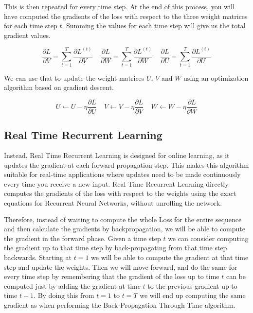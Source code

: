 \noindent This is then repeated for every time step. At the end of this process, you will have computed the gradients of the loss with respect to the three weight matrices for each time step $t$. Summing the values for each time step will give us the total gradient values.

$$ \frac{\partial L}{\partial V } = \sum_{t=1}^{T} \frac{\partial L^{(t)}}{\partial V } ~~~~~ \frac{\partial L}{\partial W } = \sum_{t=1}^{T} \frac{\partial L^{(t)}}{\partial W }  ~~~~~ \frac{\partial L}{\partial U } = \sum_{t=1}^{T} \frac{\partial L^{(t)}}{\partial U } $$

\noindent We can use that to update the weight matrices $U$, $V$ and $W$ using an optimization algorithm based on gradient descent.

$$ U \leftarrow U - \eta \frac{\partial L}{\partial U}  ~~~~~ V \leftarrow V - \eta \frac{\partial L}{\partial V} ~~~~~ W \leftarrow W - \eta \frac{\partial L}{\partial W}$$

\newpage
\subsection{Real Time Recurrent Learning}
 
Instead, Real Time Recurrent Learning is designed for online learning, as it updates the gradient at each forward propagation step. This makes this algorithm suitable for real-time applications where updates need to be made continuously every time you receive a new input. Real Time Recurrent Learning directly computes the gradients of the loss with respect to the weights using the exact equations for Recurrent Neural Networks, without unrolling the network.

 Therefore, instead of waiting to compute the whole Loss for the entire sequence and then calculate the gradients by backpropagation, we will be able to compute the gradient in the forward phase. Given a time step $t$ we can consider computing the gradient up to that time step by back-propagating from that time step backwards. Starting at $t=1$ we will be able to compute the gradient at that time step and update the weights. Then we will move forward, and do the same for every time step by remembering that the gradient of the loss up to time $t$ can be computed just by adding the gradient at time $t$ to the previous gradient up to time $t-1$. By doing this from $t=1$ to $t=T$ we will end up computing the same gradient as when performing the Back-Propagation Through Time algorithm.


